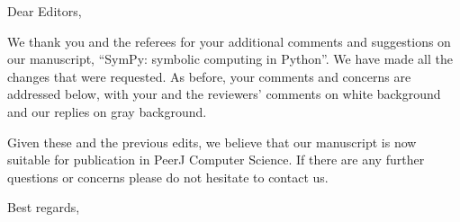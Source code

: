 \documentclass{letter}
\date{October 20, 2016} %
\begin{document}
\begin{letter}{}
\opening{Dear Editors,}
We thank you and the referees for your additional comments and suggestions on
our manuscript, ``SymPy: symbolic computing in Python''. We have made all the
changes that were requested. As before, your comments and concerns are
addressed below, with your and the reviewers' comments on white background and
our replies on gray background.

Given these and the previous edits, we believe that our manuscript is now
suitable for publication in PeerJ Computer Science. If there are any further
questions or concerns please do not hesitate to contact us.

\closing{Best regards,\\
 \\
}

\end{letter}
\end{document}
